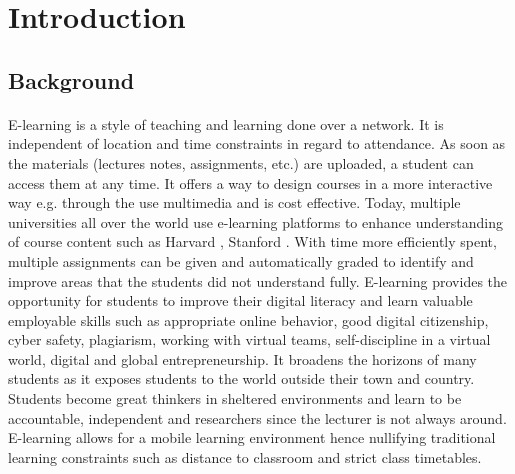 \documentclass[12pt]{article}
\begin{document}
\section{Introduction}
	\subsection{Background}

\paragraph{} E-learning is a style of teaching and learning done over a network. It is independent of location and time constraints in regard to attendance. As soon as the materials (lectures notes, assignments, etc.) are uploaded, a student can access them at any time. It offers a way to design courses in a more interactive way e.g. through the use multimedia and is cost effective. Today, multiple universities all over the world use e-learning platforms to enhance understanding of course content such as Harvard \cite{harv}, Stanford \cite{stan}. With time more efficiently spent, multiple assignments can be given and automatically graded to identify and improve areas that the students did not understand fully. E-learning provides the opportunity for students to improve their digital literacy and learn valuable employable skills such as appropriate online behavior, good digital citizenship, cyber safety, plagiarism, working with virtual teams, self-discipline in a virtual world, digital and global entrepreneurship. It broadens the horizons of many students as it exposes students to the world outside their town and country. Students become great thinkers in sheltered environments and learn to be accountable, independent and researchers since the lecturer is not always around. E-learning allows for a mobile learning environment hence nullifying traditional learning constraints such as distance to classroom and strict class timetables.
\end{document}

